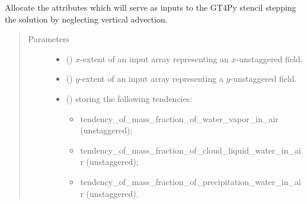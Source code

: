 \documentclass[letterpaper,10pt,english]{sphinxmanual}
\begin{document}
\begin{fulllineitems}
\begin{fulllineitems}
\label{\detokenize{api:tasmania.dycore.prognostic_isentropic_centered.PrognosticIsentropicCentered._stencils_stepping_by_neglecting_vertical_advection_allocate_inputs}}
Allocate the attributes which will serve as inputs to the GT4Py stencil stepping the solution
by neglecting vertical advection.
\begin{quote}\begin{description}
\item[{Parameters}] \leavevmode\begin{itemize}
\item {} 
 () \textendash{} \(x\)-extent of an input array representing an \(x\)-unstaggered field.

\item {} 
 () \textendash{} \(y\)-extent of an input array representing a \(y\)-unstaggered field.

\item {} 
 () \textendash{} 
{\hyperref[\detokenize{api:tasmania.storages.grid_data.GridData}]{}} storing the following tendencies:
\begin{itemize}
\item {} 
tendency\_of\_mass\_fraction\_of\_water\_vapor\_in\_air (unstaggered);

\item {} 
tendency\_of\_mass\_fraction\_of\_cloud\_liquid\_water\_in\_air (unstaggered);

\item {} 
tendency\_of\_mass\_fraction\_of\_precipitation\_water\_in\_air (unstaggered).

\end{itemize}


\end{itemize}

\end{description}\end{quote}

\end{fulllineitems}



\end{fulllineitems}
\end{document}
